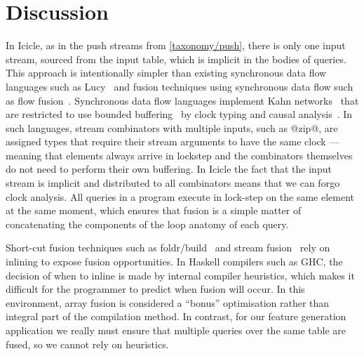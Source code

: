\section{Discussion}
\label{icicle:s:Conclusion}


In Icicle, as in the push streams from \autoref{taxonomy/push}, there is only one input stream, sourced from the input table, which is implicit in the bodies of queries.
This approach is intentionally simpler than existing synchronous data flow languages such as Lucy~\cite{mandel2010lucy} and fusion techniques using synchronous data flow such as flow fusion~\cite{lippmeier2013data}.
Synchronous data flow languages implement Kahn networks~\cite{vrba2009kahn} that are restricted to use bounded buffering~\cite{johnston2004advances} by clock typing and causal analysis~\cite{stephens1997survey}.
In such languages, stream combinators with multiple inputs, such as @zip@, are assigned types that require their stream arguments to have the same clock --- meaning that elements always arrive in lockstep and the combinators themselves do not need to perform their own buffering.
In Icicle the fact that the input stream is implicit and distributed to all combinators means that we can forgo clock analysis.
All queries in a program execute in lock-step on the same element at the same moment, which ensures that fusion is a simple matter of concatenating the components of the loop anatomy of each query.

Short-cut fusion techniques such as foldr/build~\cite{gill1993short} and stream fusion~\cite{coutts2007stream} rely on inlining to expose fusion opportunities.
In Haskell compilers such as GHC, the decision of when to inline is made by internal compiler heuristics, which makes it difficult for the programmer to predict when fusion will occur.
In this environment, array fusion is considered a ``bonus'' optimisation rather than integral part of the compilation method.
In contrast, for our feature generation application we really must ensure that multiple queries over the same table are fused, so we cannot rely on heuristics.

